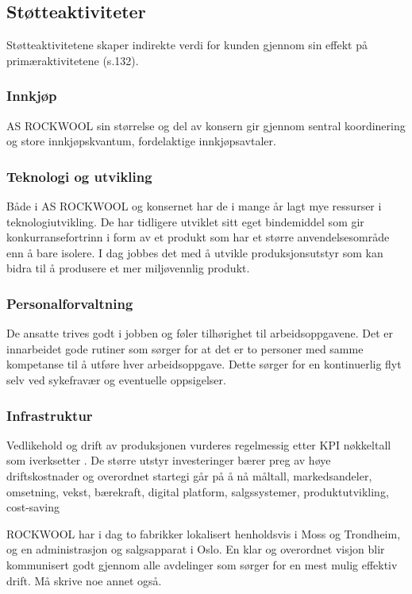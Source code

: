 \subsection{Støtteaktiviteter}
Støtteaktivitetene skaper indirekte verdi for kunden gjennom sin effekt på primæraktivitetene (s.132). 

\subsubsection*{Innkjøp}
AS ROCKWOOL sin størrelse og del av konsern gir gjennom sentral koordinering og store innkjøpskvantum, fordelaktige innkjøpsavtaler.

\subsubsection*{Teknologi og utvikling}
Både i AS ROCKWOOL og konsernet har de i mange år lagt mye ressurser i teknologiutvikling. De har tidligere utviklet sitt eget bindemiddel som gir konkurransefortrinn i form av et produkt som har et større anvendelsesområde enn å bare isolere. I dag jobbes det med å utvikle produksjonsutstyr som kan bidra til å produsere et mer miljøvennlig produkt.

\subsubsection*{Personalforvaltning}
De ansatte trives godt i jobben og føler tilhørighet til arbeidsoppgavene. Det er innarbeidet gode rutiner som sørger for at det er to personer med samme kompetanse til å utføre hver arbeidsoppgave. Dette sørger for en kontinuerlig flyt selv ved sykefravær og eventuelle oppsigelser. 

\subsubsection*{Infrastruktur}
Vedlikehold og drift av produksjonen vurderes regelmessig etter KPI nøkkeltall som iverksetter . De større utstyr investeringer bærer preg av høye driftskostnader og overordnet startegi går på å nå måltall, markedsandeler, omsetning, vekst, bærekraft, digital platform, salgssystemer, produktutvikling, cost-saving

\indent \newline
ROCKWOOL har i dag to fabrikker lokalisert henholdsvis i Moss og Trondheim, og en administrasjon og salgsapparat i Oslo. En klar og overordnet visjon blir kommunisert godt gjennom alle avdelinger som sørger for en mest mulig effektiv drift. Må skrive noe annet også.
  
